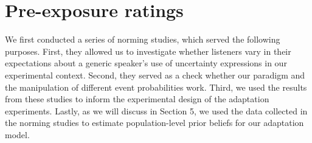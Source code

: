 \documentclass[lucida,biblatex]{sp} %
\newcommand{\sectionref}[1]{Section \ref{#1}}
\begin{document}



\section{Pre-exposure ratings}
\label{sec:exp-norming}

We first conducted a series of norming studies, which served the following purposes.
First, they allowed us to investigate whether listeners vary in their expectations about
a generic speaker's use of uncertainty expressions in our experimental context. 
Second, they served as a check whether our paradigm and the manipulation of different event probabilities work. 
Third, we used the results from these studies to inform the experimental design of the adaptation experiments. 
Lastly, as we will discuss in Section 5, we used the data collected in the norming studies to 
estimate population-level prior beliefs for our adaptation model.
\end{document}
